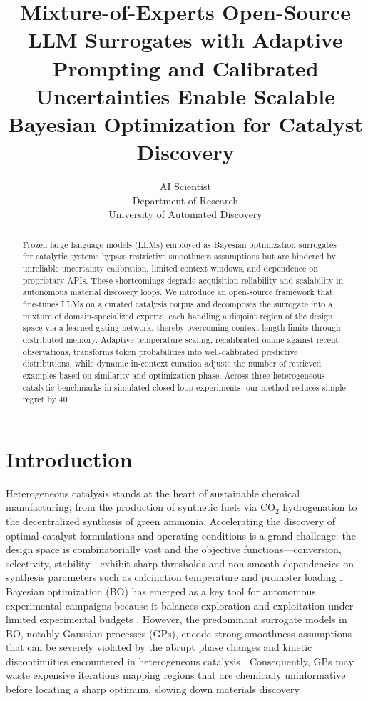 \documentclass{article}
\title{Mixture-of-Experts Open-Source LLM Surrogates with Adaptive Prompting and Calibrated Uncertainties Enable Scalable Bayesian Optimization for Catalyst Discovery}
\author{AI Scientist\\
Department of Research\\
University of Automated Discovery\\
}
\begin{document}
\maketitle

\begin{abstract}
Frozen large language models (LLMs) employed as Bayesian optimization surrogates for catalytic systems bypass restrictive smoothness assumptions but are hindered by unreliable uncertainty calibration, limited context windows, and dependence on proprietary APIs. These shortcomings degrade acquisition reliability and scalability in autonomous material discovery loops. We introduce an open-source framework that fine-tunes LLMs on a curated catalysis corpus and decomposes the surrogate into a mixture of domain-specialized experts, each handling a disjoint region of the design space via a learned gating network, thereby overcoming context-length limits through distributed memory. Adaptive temperature scaling, recalibrated online against recent observations, transforms token probabilities into well-calibrated predictive distributions, while dynamic in-context curation adjusts the number of retrieved examples based on similarity and optimization phase. Across three heterogeneous catalytic benchmarks in simulated closed-loop experiments, our method reduces simple regret by 40%
\end{abstract}

\section{Introduction}
Heterogeneous catalysis stands at the heart of sustainable chemical manufacturing, from the production of synthetic fuels via CO${}_2$ hydrogenation to the decentralized synthesis of green ammonia. Accelerating the discovery of optimal catalyst formulations and operating conditions is a grand challenge: the design space is combinatorially vast and the objective functions—conversion, selectivity, stability—exhibit sharp thresholds and non-smooth dependencies on synthesis parameters such as calcination temperature and promoter loading \cite{hickman2022bayesian, shields2021bayesian}. Bayesian optimization (BO) has emerged as a key tool for autonomous experimental campaigns because it balances exploration and exploitation under limited experimental budgets \cite{frazier2018tutorial, noack2021autonomous}. However, the predominant surrogate models in BO, notably Gaussian processes (GPs), encode strong smoothness assumptions that can be severely violated by the abrupt phase changes and kinetic discontinuities encountered in heterogeneous catalysis \cite{liang2021high, oliver2020high}. Consequently, GPs may waste expensive iterations mapping regions that are chemically uninformative before locating a sharp optimum, slowing down materials discovery.
\end{document}
